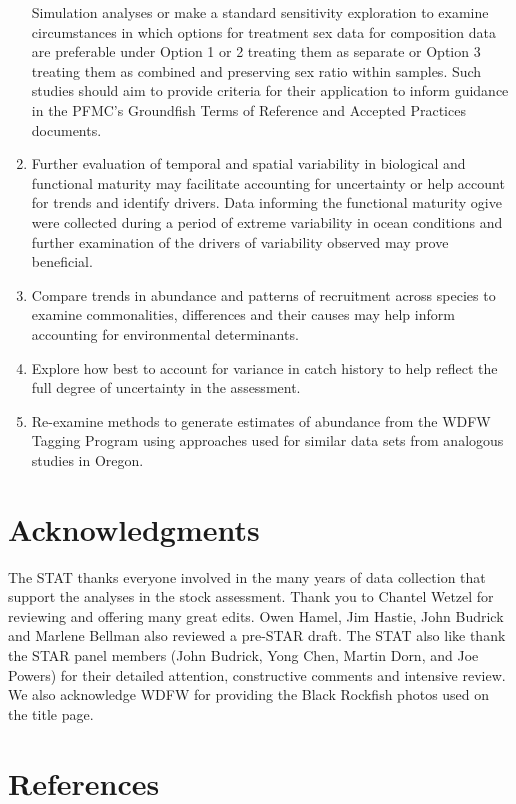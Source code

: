 \documentclass[11pt,
  letterpaper,
]{article}
\begin{document}
\begin{enumerate}
  Simulation analyses or make a standard sensitivity exploration to examine circumstances in which options for treatment sex data for composition data are preferable under Option 1 or 2 treating them as separate or Option 3 treating them as combined and preserving sex ratio within samples. Such studies should aim to provide criteria for their application to inform guidance in the PFMC's Groundfish Terms of Reference and Accepted Practices documents.
\item
  Further evaluation of temporal and spatial variability in biological and functional maturity may facilitate accounting for uncertainty or help account for trends and identify drivers. Data informing the functional maturity ogive were collected during a period of extreme variability in ocean conditions and further examination of the drivers of variability observed may prove beneficial.
\item
  Compare trends in abundance and patterns of recruitment across species to examine commonalities, differences and their causes may help inform accounting for environmental determinants.
\item
  Explore how best to account for variance in catch history to help reflect the full degree of uncertainty in the assessment.
\item
  Re-examine methods to generate estimates of abundance from the WDFW Tagging Program using approaches used for similar data sets from analogous studies in Oregon.
\end{enumerate}

\hypertarget{acknowledgments}{%
\section{Acknowledgments}\label{acknowledgments}}

The STAT thanks everyone involved in the many years of data collection that support the analyses in the stock assessment. Thank you to Chantel Wetzel for reviewing and offering many great edits. Owen Hamel, Jim Hastie, John Budrick and Marlene Bellman also reviewed a pre-STAR draft. The STAT also like thank the STAR panel members (John Budrick, Yong Chen, Martin Dorn, and Joe Powers) for their detailed attention, constructive comments and intensive review. We also acknowledge WDFW for providing the Black Rockfish photos used on the title page.

\clearpage

\hypertarget{references}{%
\section{References}\label{references}}
\end{document}
